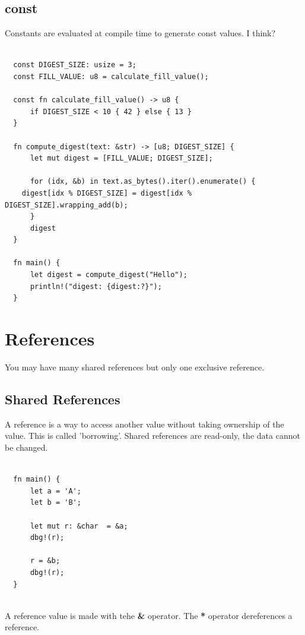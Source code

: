 \documentclass[11pt]{article}
\begin{document}
\subsection{const}
\label{sec:orgaf7248f}

Constants are evaluated at compile time to generate const values. I think?

\begin{verbatim}

  const DIGEST_SIZE: usize = 3;
  const FILL_VALUE: u8 = calculate_fill_value();

  const fn calculate_fill_value() -> u8 {
      if DIGEST_SIZE < 10 { 42 } else { 13 }
  }

  fn compute_digest(text: &str) -> [u8; DIGEST_SIZE] {
      let mut digest = [FILL_VALUE; DIGEST_SIZE];

      for (idx, &b) in text.as_bytes().iter().enumerate() {
  	digest[idx % DIGEST_SIZE] = digest[idx % DIGEST_SIZE].wrapping_add(b);
      }
      digest
  }

  fn main() {
      let digest = compute_digest("Hello");
      println!("digest: {digest:?}");
  }

\end{verbatim}
\section{References}
\label{sec:orgaf4bb0b}

You may have many shared references but only one exclusive reference.
\subsection{Shared References}
\label{sec:orge33f5f4}

A reference is a way to access another value without taking ownership of the value. This is called 'borrowing'.
Shared references are read-only, the data cannot be changed.

\begin{verbatim}

  fn main() {
      let a = 'A';
      let b = 'B';

      let mut r: &char  = &a;
      dbg!(r);

      r = &b;
      dbg!(r);
  }


\end{verbatim}

A reference value is made with tehe \textbf{\&} operator. The \textbf{*} operator dereferences a reference.
\end{document}
